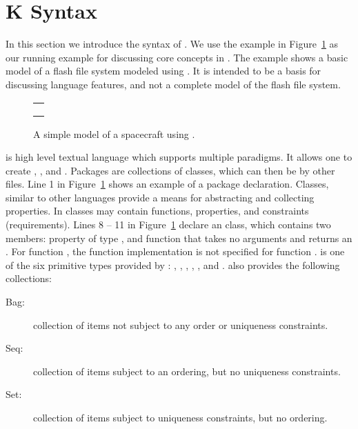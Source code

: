\section{K Syntax}

In this section we introduce the syntax of \Klang{}. We use the
\Klang{} example in Figure~\ref{fig:fs} as our running example for
discussing core concepts in \Klang{}. The example shows a basic model
of a flash file system modeled using \Klang{}. It is intended to be a
basis for discussing language features, and not a complete model of
the flash file system.

\begin{figure}
\centering
\begin{tabular}{c}
\hline \\
 \\ \\
\hline
\end{tabular}
\caption{A simple model of a spacecraft using \Klang{}.}
\label{fig:fs}
\end{figure}

\Klang{} is high level textual language which supports multiple
paradigms. It allows one to create , ,
and . Packages are collections of classes, which can
then be  by other \Klang{} files. Line 1 in
Figure~\ref{fig:fs} shows an example of a package
declaration. Classes, similar to other languages provide a means for
abstracting and collecting properties. In \Klang{} classes may contain
functions, properties, and constraints (requirements). Lines 8 -- 11
in Figure~\ref{fig:fs} declare an  class, which contains
two members: property  of type , and function
 that takes no arguments and returns an . For
function , the function implementation is not specified for
function .  is one of the six primitive types
provided by \Klang{}: , , ,
, , and . \Klang{} also provides
the following collections:

\begin{description}
\item [Bag:] collection of items not subject to any order
  or uniqueness constraints.
\item [Seq:] collection of items subject to an ordering, but
  no uniqueness constraints.
\item [Set:] collection of items subject to uniqueness
  constraints, but no ordering.
\end{description}

